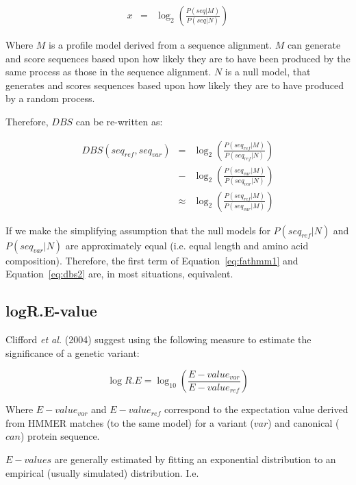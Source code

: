 \documentclass[fleqn,10pt]{SelfArx} %
\begin{document}
\begin{eqnarray} 
\label{eq:bs}
x &=& \log_2\left(\frac{P(seq|M)}{P(seq|N)} \right)
\end{eqnarray}

Where $M$ is a profile model derived from a sequence alignment. $M$
can generate and score sequences based upon how likely they are to
have been produced by the same process as those in the sequence
alignment.  $N$ is a null model, that generates and scores sequences
based upon how likely they are to have produced by a random process.

Therefore, $DBS$ can be re-written as:

\begin{eqnarray} 
\label{eq:dbs}
DBS(seq_{ref}, seq_{var}) &=&      \log_2\left(\frac{P(seq_{ref}|M)}{P(seq_{ref}|N)}\right) \nonumber\\ 
\label{eq:dbs1}
                                & - & \log_2\left(\frac{P(seq_{var}|M)}{P(seq_{var}|N)}\right)\\
\label{eq:dbs2}
                               &\approx& \log_2\left(\frac{P(seq_{ref}|M)}{P(seq_{var}|M)} \right)
\end{eqnarray}

If we make the simplifying assumption that the null models for
$P(seq_{ref}|N)$ and $P(seq_{var}|N)$ are approximately equal
(i.e. equal length and amino acid composition).  Therefore, the first
term of Equation~\ref{eq:fathmm1} and Equation~\ref{eq:dbs2} are, in
most situations, equivalent. 



\subsection{logR.E-value}

Clifford \emph{et al.} (2004) suggest using the following measure to
estimate the significance of a genetic variant:

\begin{equation} 
\label{eq:logre}
\log R.E = \log_{10}\left(\frac{E-value_{var}}{E-value_{ref}}\right)
\end{equation}

Where $E-value_{var}$ and $E-value_{ref}$ correspond to the
expectation value derived from HMMER matches (to the same model) for a
variant ($var$) and canonical ($can$) protein sequence. 

$E-values$ are generally estimated by fitting an exponential
distribution to an empirical (usually simulated)
distribution. I.e. 
\end{document}
